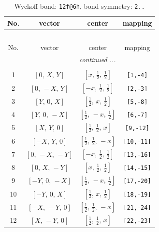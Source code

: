 \documentclass[fleqn,8pt]{jsarticle}
\begin{document}
\renewcommand{\arraystretch}{1.2}
\begin{longtable}{cccc}
\caption{Wyckoff bond: {\tt 12f@6h}, bond symmetry: {\tt 2..}}
 \\
 \hline \hline
No. & vector & center & mapping \\ \hline \endfirsthead

\multicolumn{3}{l}{\tablename\ \thetable{}} \\
 \hline \hline
No. & vector & center & mapping \\ \hline \endhead

 \hline \hline
\multicolumn{3}{r}{\footnotesize\it continued ...} \\ \endfoot

 \hline \hline
\multicolumn{3}{r}{} \\ \endlastfoot

1 & $\left[ 0,\, X,\, Y \right]$ & $\left[ x,\, \frac{1}{2},\, \frac{1}{2} \right]$ & {\tt [1,-4]} \\ \hline
2 & $\left[ 0,\, - X,\, Y \right]$ & $\left[ - x,\, \frac{1}{2},\, \frac{1}{2} \right]$ & {\tt [2,-3]} \\ \hline
3 & $\left[ Y,\, 0,\, X \right]$ & $\left[ \frac{1}{2},\, x,\, \frac{1}{2} \right]$ & {\tt [5,-8]} \\ \hline
4 & $\left[ Y,\, 0,\, - X \right]$ & $\left[ \frac{1}{2},\, - x,\, \frac{1}{2} \right]$ & {\tt [6,-7]} \\ \hline
5 & $\left[ X,\, Y,\, 0 \right]$ & $\left[ \frac{1}{2},\, \frac{1}{2},\, x \right]$ & {\tt [9,-12]} \\ \hline
6 & $\left[ - X,\, Y,\, 0 \right]$ & $\left[ \frac{1}{2},\, \frac{1}{2},\, - x \right]$ & {\tt [10,-11]} \\ \hline
7 & $\left[ 0,\, - X,\, - Y \right]$ & $\left[ - x,\, \frac{1}{2},\, \frac{1}{2} \right]$ & {\tt [13,-16]} \\ \hline
8 & $\left[ 0,\, X,\, - Y \right]$ & $\left[ x,\, \frac{1}{2},\, \frac{1}{2} \right]$ & {\tt [14,-15]} \\ \hline
9 & $\left[ - Y,\, 0,\, - X \right]$ & $\left[ \frac{1}{2},\, - x,\, \frac{1}{2} \right]$ & {\tt [17,-20]} \\ \hline
10 & $\left[ - Y,\, 0,\, X \right]$ & $\left[ \frac{1}{2},\, x,\, \frac{1}{2} \right]$ & {\tt [18,-19]} \\ \hline
11 & $\left[ - X,\, - Y,\, 0 \right]$ & $\left[ \frac{1}{2},\, \frac{1}{2},\, - x \right]$ & {\tt [21,-24]} \\ \hline
12 & $\left[ X,\, - Y,\, 0 \right]$ & $\left[ \frac{1}{2},\, \frac{1}{2},\, x \right]$ & {\tt [22,-23]} \\
\end{longtable}
\end{document}
